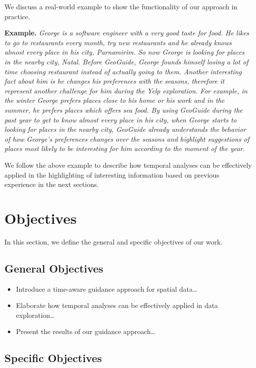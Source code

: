 We discuss a real-world example to show the functionality of our approach in practice.

\textbf{Example.} \textit{George is a software engineer with a very good taste for food.
	He likes to go to restaurants every month, try new restaurants and he
	already knows almost every place in his city, Parnamirim. So now George is looking
	for places in the nearby city, Natal. Before GeoGuide, George founds himself losing
	a lot of time choosing restaurant instead of actually going to them. Another interesting fact about him is he
	changes his preferences with the seasons, therefore it represent another challenge for him during the
	Yelp exploration. For example, in the winter George prefers places close to his
	home or his work and in the summer, he prefers places which offers sea food.
	By using GeoGuide during the past year to get to know almost every place in his city,
	when George starts to looking for places in the nearby city, GeoGuide already
	understands the behavior of how George's preferences changes over the seasons and highlight
	suggestions of places most likely to be interesting for him according to
	the moment of the year.}

We follow the above example to describe how temporal analyses can be effectively
applied in the highlighting of interesting information based on previous experience
in the next sections.

\section{Objectives}

In this section, we define the general and specific objectives of our work.

\subsection{General Objectives}

\begin{itemize}
	\item Introduce a time-aware guidance approach for spatial data\ldots
	\item Elaborate how temporal analyses can be effectively applied in data exploration\ldots
	\item Present the results of our guidance approach\ldots
\end{itemize}

\subsection{Specific Objectives}

